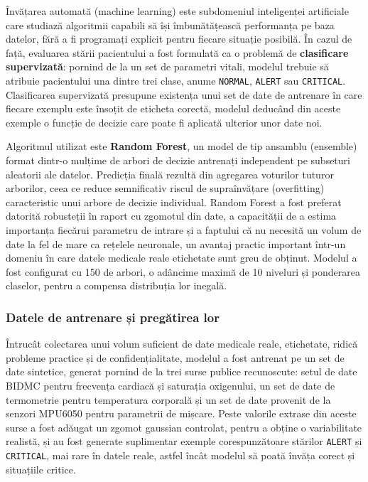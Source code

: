 \documentclass[12pt,a4paper]{article}
\begin{document}
Învățarea automată (machine learning) este subdomeniul inteligenței artificiale care studiază algoritmii capabili să își îmbunătățească performanța pe baza datelor, fără a fi programați explicit pentru fiecare situație posibilă. În cazul de față, evaluarea stării pacientului a fost formulată ca o problemă de \textbf{clasificare supervizată}: pornind de la un set de parametri vitali, modelul trebuie să atribuie pacientului una dintre trei clase, anume \texttt{NORMAL}, \texttt{ALERT} sau \texttt{CRITICAL}. Clasificarea supervizată presupune existența unui set de date de antrenare în care fiecare exemplu este însoțit de eticheta corectă, modelul deducând din aceste exemple o funcție de decizie care poate fi aplicată ulterior unor date noi.

Algoritmul utilizat este \textbf{Random Forest}, un model de tip ansamblu (ensemble) format dintr-o mulțime de arbori de decizie antrenați independent pe subseturi aleatorii ale datelor. Predicția finală rezultă din agregarea voturilor tuturor arborilor, ceea ce reduce semnificativ riscul de supraînvățare (overfitting) caracteristic unui arbore de decizie individual. Random Forest a fost preferat datorită robusteții în raport cu zgomotul din date, a capacității de a estima importanța fiecărui parametru de intrare și a faptului că nu necesită un volum de date la fel de mare ca rețelele neuronale, un avantaj practic important într-un domeniu în care datele medicale reale etichetate sunt greu de obținut. Modelul a fost configurat cu 150 de arbori, o adâncime maximă de 10 niveluri și ponderarea claselor, pentru a compensa distribuția lor inegală.

\subsubsection{Datele de antrenare și pregătirea lor}

Întrucât colectarea unui volum suficient de date medicale reale, etichetate, ridică probleme practice și de confidențialitate, modelul a fost antrenat pe un set de date sintetice, generat pornind de la trei surse publice recunoscute: setul de date BIDMC pentru frecvența cardiacă și saturația oxigenului, un set de date de termometrie pentru temperatura corporală și un set de date provenit de la senzori MPU6050 pentru parametrii de mișcare. Peste valorile extrase din aceste surse a fost adăugat un zgomot gaussian controlat, pentru a obține o variabilitate realistă, și au fost generate suplimentar exemple corespunzătoare stărilor \texttt{ALERT} și \texttt{CRITICAL}, mai rare în datele reale, astfel încât modelul să poată învăța corect și situațiile critice.
\end{document}
